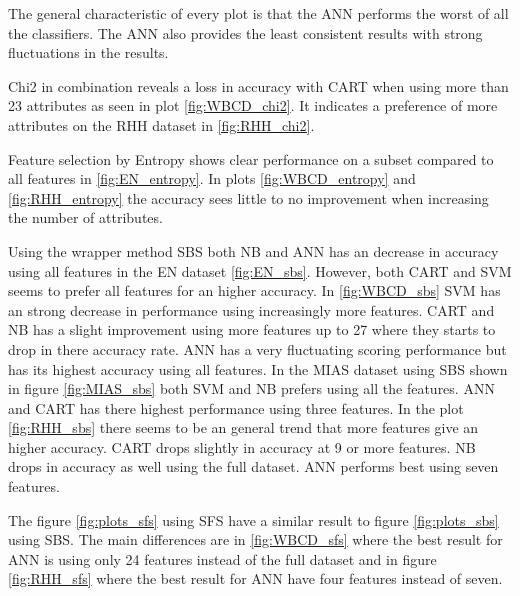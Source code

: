 The general characteristic of every plot is that the ANN performs the worst of all the classifiers. The ANN also provides the least consistent results with strong fluctuations in the results.

Chi2 in combination reveals a loss in accuracy with CART when using more than 23 attributes as seen in plot \ref{fig:WBCD_chi2}. It indicates a preference of more attributes on the RHH dataset in \ref{fig:RHH_chi2}.

Feature selection by Entropy shows clear performance on a subset compared to all features in \ref{fig:EN_entropy}. In plots \ref{fig:WBCD_entropy} and \ref{fig:RHH_entropy} the accuracy sees little to no improvement when increasing the number of attributes.

Using the wrapper method SBS both NB and ANN has an decrease in accuracy using all features in the EN dataset \ref{fig:EN_sbs}. However, both CART and SVM seems to prefer all features for an higher accuracy. In \ref{fig:WBCD_sbs} SVM has an strong decrease in performance using increasingly more features. CART and NB has a slight improvement using more features up to 27 where they starts to drop in there accuracy rate.  ANN has a very fluctuating scoring performance but has its highest accuracy using all features.  In the MIAS dataset using SBS shown in figure \ref{fig:MIAS_sbs} both SVM and NB prefers using all the features. ANN and CART has there highest performance using three features. In the plot \ref{fig:RHH_sbs} there seems to be an general trend that more features give an higher accuracy. CART drops slightly in accuracy at 9 or more features. NB drops in accuracy as well using the full dataset. ANN performs best using seven features.

The figure \ref{fig:plots_sfs} using SFS have a similar result to figure \ref{fig:plots_sbs} using SBS. The main differences are in \ref{fig:WBCD_sfs} where the best result for ANN is using only 24 features instead of the full dataset and in figure \ref{fig:RHH_sfs} where the best result for ANN have four features instead of seven.


